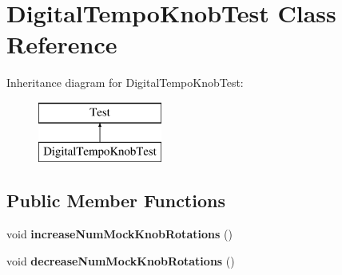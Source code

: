 \hypertarget{class_digital_tempo_knob_test}{}\section{Digital\+Tempo\+Knob\+Test Class Reference}
\label{class_digital_tempo_knob_test}
Inheritance diagram for Digital\+Tempo\+Knob\+Test\+:\begin{figure}[H]
\begin{center}
\leavevmode
\includegraphics[height=2.000000cm]{class_digital_tempo_knob_test}
\end{center}
\end{figure}
\subsection*{Public Member Functions}
\begin{DoxyCompactItemize}
\item 
\mbox{\label{class_digital_tempo_knob_test_a6a08032b350f47b00b7314bde6648534}} 
void {\bfseries increase\+Num\+Mock\+Knob\+Rotations} ()
\item 
\mbox{\label{class_digital_tempo_knob_test_a7726fa2ffaf455922533bcbcca01b864}} 
void {\bfseries decrease\+Num\+Mock\+Knob\+Rotations} ()
\end{DoxyCompactItemize}

